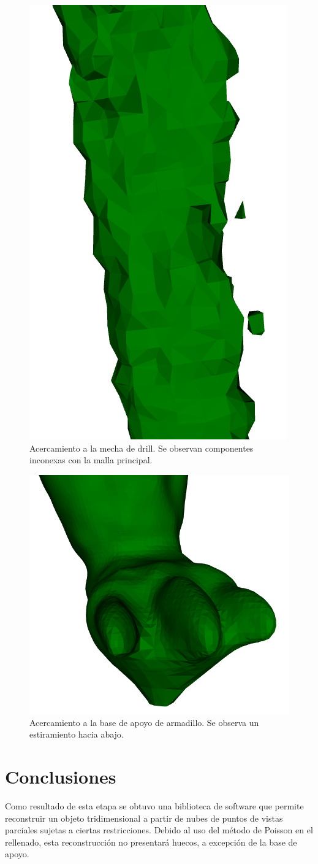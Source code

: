 		\begin{figure}
			\centering
			\includegraphics[max width=.5\linewidth, max height=.25\textheight, keepaspectratio]
				{img/drill_drops}
			\caption{\label{fig:drill_drops}Acercamiento a la mecha de drill. Se observan componentes inconexas con la malla principal.}
		\end{figure}

		\begin{figure}
			\centering
			\includegraphics[max width=.5\linewidth, max height=.25\textheight, keepaspectratio]
				{img/arma_foot}
			\caption{\label{fig:base}Acercamiento a la base de apoyo de armadillo. Se observa un estiramiento hacia abajo.}
		\end{figure}



	\section{Conclusiones}
		Como resultado de esta etapa se obtuvo una biblioteca de software que
		permite reconstruir un objeto tridimensional a partir de nubes
		de puntos de vistas parciales sujetas a ciertas restricciones.
		Debido al uso del método de Poisson en el rellenado, esta
		reconstrucción no presentará huecos, a excepción de la base de apoyo.

